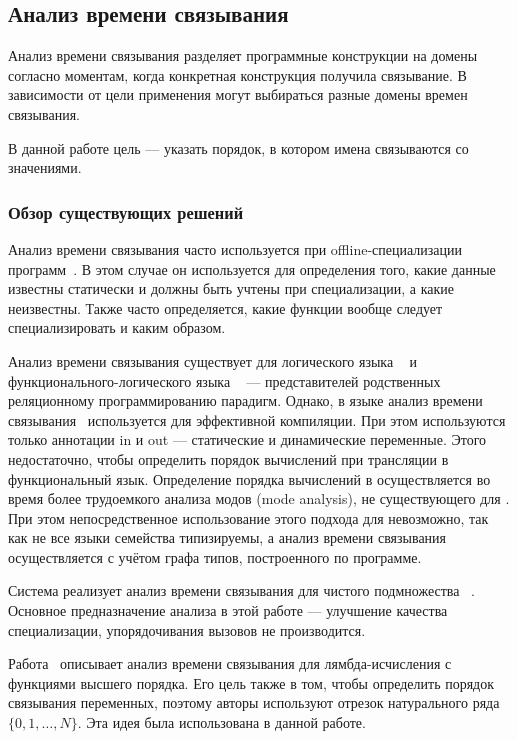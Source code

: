 \subsection{Анализ времени связывания}

Анализ времени связывания разделяет программные конструкции на домены согласно моментам, когда конкретная конструкция получила связывание.
В зависимости от цели применения могут выбираться разные домены времен связывания.

В данной работе цель --- указать порядок, в котором имена связываются со значениями.

\subsubsection{Обзор существующих решений}

Анализ времени связывания часто используется при offline-специализации программ~\cite{jones1993partial}. 
В этом случае он используется для определения того, какие данные известны статически и должны быть учтены при специализации, а какие неизвестны. 
Также часто определяется, какие функции вообще следует специализировать и каким образом. 

Анализ времени связывания существует для логического языка \prolog{}~\cite{leuschel2004prolog} и функционального-логического языка \mercury{}~\cite{vanhoof2004binding} --- представителей родственных реляционному программированию парадигм.
Однако, в языке \mercury{} анализ времени связывания~\cite{vanhoof2004binding} используется для эффективной компиляции. 
При этом используются только аннотации in и out --- статические и динамические переменные. 
Этого недостаточно, чтобы определить порядок вычислений при трансляции в функциональный язык.
Определение порядка вычислений в \mercury{} осуществляется во время более трудоемкого анализа модов (mode analysis), не существующего для \miniKanren{}. 
При этом непосредственное использование этого подхода для \miniKanren{} невозможно, так как не все языки семейства типизируемы, а анализ времени связывания \mercury{} осуществляется с учётом графа типов, построенного по программе. 

Система \logen{} реализует анализ времени связывания для чистого подмножества \prolog{}~\cite{leuschel2004prolog}.
Основное предназначение анализа в этой работе --- улучшение качества специализации, упорядочивания вызовов не производится. 

Работа~\cite{Thiemann1997AUF} описывает анализ времени связывания для лямбда-исчисления с функциями высшего порядка. 
Его цель также в том, чтобы определить порядок связывания переменных, поэтому авторы используют отрезок натурального ряда $\{ 0, 1, \dots, N\}$. 
Эта идея была использована в данной работе.
